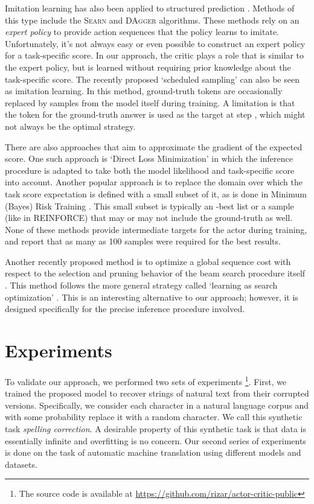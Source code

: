\documentclass{article} \usepackage{iclr2017_conference,times}
\begin{document}
Imitation learning has also been
applied to structured prediction \citep{vlachos2012investigation}.
Methods of this type include the \textsc{Searn} \citep{daume2009search}
and \textsc{DAgger} \citep{ross2010reduction} algorithms.
These methods rely on an 
\emph{expert policy} to provide action sequences that the policy
learns to imitate. Unfortunately, it's not always easy or even
possible to construct an expert policy for a task-specific score. 
In our approach, the critic plays a role that is similar to the
expert policy, but is learned without requiring
prior knowledge about the task-specific score.
The recently proposed `scheduled sampling'
\citep{bengio2015scheduled} can also be seen as imitation learning.
In this method, ground-truth tokens are occasionally replaced by
samples from the model itself during training. A limitation
is that the token  for the ground-truth answer is used as the target at 
step , which might not always be the optimal strategy.

There are also approaches that aim to approximate the gradient of the
expected score. One such approach is
`Direct Loss Minimization' \citep{hazan2010} in which the
inference procedure is adapted to take both the model likelihood and
task-specific score into account.
Another popular approach is to replace the domain over which the task score expectation is
defined with a small subset of it, as is done in Minimum (Bayes) Risk
Training \citep{goel2000minimum,shen2015minimum,och2003minimum}.
This small subset is typically an -best list or a sample (like in REINFORCE) that may or may not include
the ground-truth as well.
None of these methods provide intermediate targets for the actor during
training, and \citet{shen2015minimum} report that as many as 100 samples
were required for the best results.

Another recently proposed method is to optimize a global sequence
cost with respect to the selection and pruning behavior of the beam search procedure itself
\citep{wiseman2016sequence}. This method follows the more general strategy
called `learning as search optimization' \citep{daume2005learning}. This is an
interesting alternative to our approach; however, it is designed
specifically for the precise inference procedure involved.


\section{Experiments}

To validate our approach, we performed two sets of experiments \footnote{
The source code is available at \url{https://github.com/rizar/actor-critic-public}}.
First, we trained
the proposed model to recover strings of natural text from their corrupted versions.
Specifically, we consider each character in a natural language corpus
and with some probability replace it with a random
character. We call this synthetic task
 \textit{spelling correction}.
A desirable property of this synthetic task
is that data is essentially infinite and overfitting is no concern. 
Our second series of experiments is done on the task of automatic machine translation
using different models and datasets.
\end{document}
